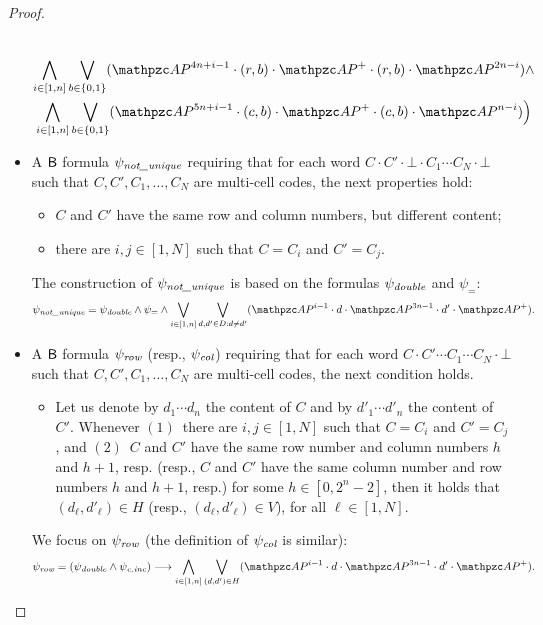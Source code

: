 \begin{proof}
\begin{itemize}
\begin{multline*}
    \\
    \bigwedge_{i\in [1,n]}\bigvee_{b\in \{0,1\}}(\Prop^{4n+i-1}\cdot (r,b) \cdot \Prop^{+}\cdot  (r,b)\cdot \Prop^{2n-i})\wedge
    \\
    \bigwedge_{i\in [1,n]}\bigvee_{b\in \{0,1\}}(\Prop^{5n+i-1}\cdot (c,b) \cdot \Prop^{+}\cdot   (c,b)\cdot \Prop^{n-i})\Bigr)
\end{multline*}
%
  \item A $\mathsf{B}$ formula $\psi_{\textit{not\_unique}}$ requiring that for each word $C\cdot C'\cdot \bot \cdot C_1 \cdots C_N\cdot \bot$ such that
  $C,C',C_1,\ldots,C_N$ are multi-cell codes, the next properties hold:
  \begin{itemize}
    \item $C$ and $C'$ have the same row and column numbers, but different content;
    \item there are $i,j\in [1,N]$ such that $C=C_i$ and $C'=C_j$.
  \end{itemize}
  The construction of $\psi_{\textit{not\_unique}}$ is based on the formulas $\psi_{\textit{double}}$ and $\psi_=$:
\begin{multline*}
    \psi_{\NU}  = \psi_{\Double} \wedge  \psi_= \wedge \bigvee_{i\in [1,n]}\bigvee_{d,d'\in D:d\neq d'}(\Prop^{i-1}\cdot d \cdot \Prop^{3n-1}\cdot d'\cdot \Prop^{+}).
\end{multline*}
%
\item A $\mathsf{B}$ formula $\psi_{\textit{row}}$ (resp., $\psi_{\textit{col}}$) requiring that for each word $C\cdot C'\cdots C_1 \cdots C_N\cdot \bot$ such that
  $C,C',C_1,\ldots,C_N$ are multi-cell codes, the next condition holds.
  \begin{itemize}
    \item Let us denote by $d_1\cdots d_n$ the content of $C$ and by $d'_1\cdots d'_n$ the content of $C'$. Whenever $(1)$~there are $i,j\in [1,N]$ such that $C=C_i$ and $C'=C_j$, and $(2)$~$C$ and $C'$ have the same row number and column numbers $h$ and $h+1$, resp. (resp., $C$ and $C'$ have the same column number and row numbers $h$ and $h+1$, resp.) for some $h\in [0,2^{n}-2]$,
         then it holds that $(d_\ell,d'_\ell)\in H$ (resp., $(d_\ell,d'_\ell)\in V$), for all
        $\ell\in [1,N]$.
  \end{itemize}
We focus on $\psi_{\textit{row}}$ (the definition of $\psi_{\textit{col}}$ is similar): 
\begin{multline*}
    \psi_{\Row}  = (\psi_{\Double} \wedge  \psi_{\CInc})  \longrightarrow  \bigwedge_{i\in [1,n]}\bigvee_{(d,d')\in H}(\Prop^{i-1}\cdot d \cdot \Prop^{3n-1}\cdot d'\cdot \Prop^{+}).
\end{multline*}
\end{itemize}


\end{proof}
